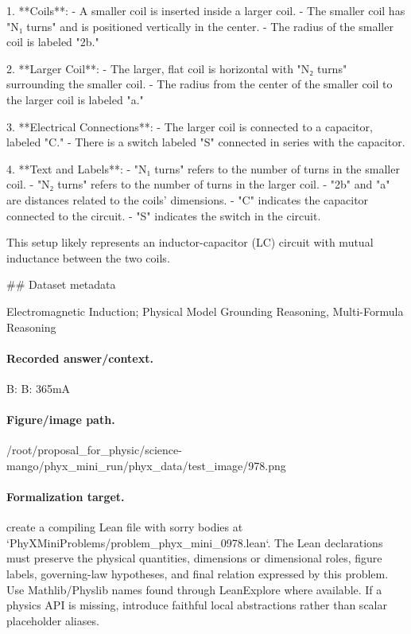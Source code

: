 1. **Coils**:
   - A smaller coil is inserted inside a larger coil.
   - The smaller coil has "N₁ turns" and is positioned vertically in the center.
   - The radius of the smaller coil is labeled "2b."

2. **Larger Coil**:
   - The larger, flat coil is horizontal with "N₂ turns" surrounding the smaller coil.
   - The radius from the center of the smaller coil to the larger coil is labeled "a."

3. **Electrical Connections**:
   - The larger coil is connected to a capacitor, labeled "C."
   - There is a switch labeled "S" connected in series with the capacitor.

4. **Text and Labels**:
   - "N₁ turns" refers to the number of turns in the smaller coil.
   - "N₂ turns" refers to the number of turns in the larger coil.
   - "2b" and "a" are distances related to the coils' dimensions.
   - "C" indicates the capacitor connected to the circuit.
   - "S" indicates the switch in the circuit.

This setup likely represents an inductor-capacitor (LC) circuit with mutual inductance between the two coils.

\#\# Dataset metadata

Electromagnetic Induction; Physical Model Grounding Reasoning, Multi-Formula Reasoning

\paragraph{Recorded answer/context.}
B: B: 365mA

\paragraph{Figure/image path.}
/root/proposal\_for\_physic/science-mango/phyx\_mini\_run/phyx\_data/test\_image/978.png

\paragraph{Formalization target.}
create a compiling Lean file with sorry bodies at `PhyXMiniProblems/problem\_phyx\_mini\_0978.lean`. The Lean declarations must preserve the physical quantities, dimensions or dimensional roles, figure labels, governing-law hypotheses, and final relation expressed by this problem.
Use Mathlib/Physlib names found through LeanExplore where available. If a physics API is missing, introduce faithful local abstractions rather than scalar placeholder aliases.


